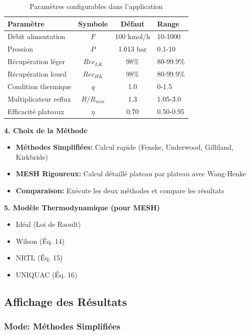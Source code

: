 \documentclass[11pt,a4paper]{article}
\begin{document}
\begin{table}[h]
\centering
\small
\begin{tabular}{lccl}
\toprule
\textbf{Paramètre} & \textbf{Symbole} & \textbf{Défaut} & \textbf{Range} \\
\midrule
Débit alimentation & $F$ & 100 kmol/h & 10-1000 \\
Pression & $P$ & 1.013 bar & 0.1-10 \\
Récupération léger & $Rec_{LK}$ & 98\% & 80-99.9\% \\
Récupération lourd & $Rec_{HK}$ & 98\% & 80-99.9\% \\
Condition thermique & $q$ & 1.0 & 0-1.5 \\
Multiplicateur reflux & $R/R_{min}$ & 1.3 & 1.05-3.0 \\
Efficacité plateaux & $\eta$ & 0.70 & 0.50-0.95 \\
\bottomrule
\end{tabular}
\caption{Paramètres configurables dans l'application}
\end{table}

\textbf{4. Choix de la Méthode}

\begin{itemize}[leftmargin=*]
    \item \textbf{Méthodes Simplifiées:} Calcul rapide (Fenske, Underwood, Gilliland, Kirkbride)
    \item \textbf{MESH Rigoureux:} Calcul détaillé plateau par plateau avec Wang-Henke
    \item \textbf{Comparaison:} Exécute les deux méthodes et compare les résultats
\end{itemize}

\textbf{5. Modèle Thermodynamique (pour MESH)}

\begin{itemize}[leftmargin=*]
    \item Idéal (Loi de Raoult)
    \item Wilson (Éq. 14)
    \item NRTL (Éq. 15)
    \item UNIQUAC (Éq. 16)
\end{itemize}

\subsection{Affichage des Résultats}

\subsubsection{Mode: Méthodes Simplifiées}
\end{document}
